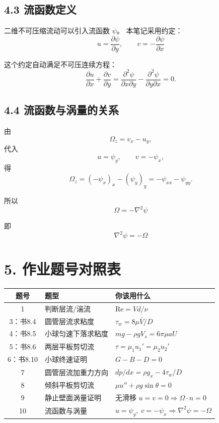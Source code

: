 \documentclass[12pt,a4paper]{ctexart}
\newcommand{\Rey}{\mathrm{Re}}
\begin{document}
\subsection*{4.3 流函数定义}

二维不可压缩流动可以引入流函数 \(\psi\)。
本笔记采用约定：
\[
\boxed{
u=\frac{\partial\psi}{\partial y},
\qquad
v=-\frac{\partial\psi}{\partial x}
}
\]

这个约定自动满足不可压连续方程：
\[
\frac{\partial u}{\partial x}
+\frac{\partial v}{\partial y}
=
\frac{\partial^2\psi}{\partial x\partial y}
-
\frac{\partial^2\psi}{\partial y\partial x}
=0.
\]

\subsection*{4.4 流函数与涡量的关系}

由
\[
\Omega_z=v_x-u_y,
\]
代入
\[
u=\psi_y,\qquad v=-\psi_x,
\]
得
\[
\Omega_z
=(-\psi_x)_x-(\psi_y)_y
=-\psi_{xx}-\psi_{yy}.
\]

所以
\[
\boxed{
\Omega=-\nabla^2\psi
}
\]

即
\[
\boxed{
\nabla^2\psi=-\Omega
}
\]

\section*{5. 作业题号对照表}

\begin{center}
\begin{tabular}{cll}
\toprule
题号 & 题型 & 你该用什么 \\
\midrule
1 & 判断层流/湍流 & \(\Rey=Vd/\nu\) \\
3：书8.4 & 圆管层流求粘度 & \(\tau_w=8\mu\bar V/D\) \\
4：书8.5 & 小球匀速下落求粘度 & \(mg-\rho gV_s=6\pi\mu aU\) \\
5：书8.6 & 两层平板剪切流 & \(\tau=\mu_1u_1'=\mu_2u_2'\) \\
6：书8.10 & 小球终速证明 & \(G-B-D=0\) \\
7 & 圆管层流加重力方向 & \(dp/dx=\rho g_x-4\tau_w/D\) \\
8 & 倾斜平板剪切流 & \(\mu u''+\rho g\sin\theta=0\) \\
9 & 静止壁面涡量证明 & 无滑移 \(u=v=0\Rightarrow\Omega\cdot n=0\) \\
10 & 流函数与涡量 & \(u=\psi_y,\ v=-\psi_x\Rightarrow\nabla^2\psi=-\Omega\) \\
\bottomrule
\end{tabular}
\end{center}
\end{document}
